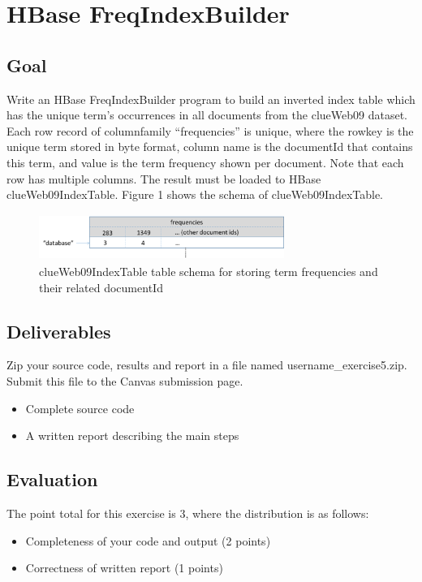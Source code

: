\section*{HBase FreqIndexBuilder}
\subsection*{Goal}
Write an HBase FreqIndexBuilder program to build an inverted index table which
has the unique term's occurrences in all documents from the clueWeb09 dataset.
Each row record of columnfamily ``frequencies'' is unique, where the rowkey is
the unique term stored in byte format, column name is the documentId that
contains this term, and value is the term frequency shown per document. Note
that each row has multiple columns. The result must be loaded to HBase
clueWeb09IndexTable. Figure 1 shows the schema of clueWeb09IndexTable.

\begin{figure}[!htbp]
\includegraphics[width=8cm,height=1.5cm]{section/icloud/assignment/problems/project5/p5-1}
\centering
\caption{clueWeb09IndexTable table schema for storing term frequencies and their related documentId}
\end{figure}

\subsection*{Deliverables}
Zip your source code, results and report in a file named
username\_exercise5.zip. Submit this file to the Canvas submission page.

\begin{itemize}
\item Complete source code
\item A written report describing the main steps
\end{itemize}

\subsection*{Evaluation}
The point total for this exercise is 3, where the distribution is as follows:
\begin{itemize}
\item Completeness of your code and output (2 points)
\item Correctness of written report (1 points)
\end{itemize}

